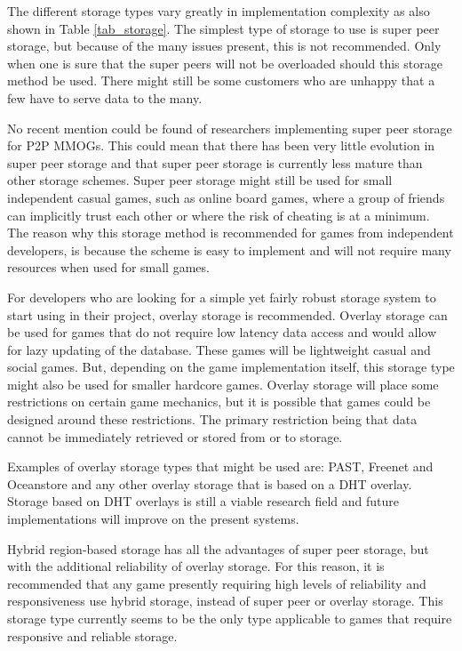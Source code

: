 \documentclass[10pt,a4paper,journal,cspaper,compsoc]{IEEEtran}
\begin{document}
The different storage types vary greatly in implementation complexity as also shown in Table \ref{tab_storage}. The simplest type of storage to use
is super peer storage, but because of the many issues present, this is not recommended. Only when one is sure that the super peers will not be
overloaded should this storage method be used. There might still be some customers who are unhappy that a few have to serve data to the many.

No recent mention could be found of researchers implementing super peer storage for P2P MMOGs. This could mean that there has been very little
evolution in super peer storage and that super peer storage is currently less mature than other storage schemes. Super peer storage might still be
used for small independent casual games, such as online board games, where a group of friends can implicitly trust each other or where the risk of
cheating is at a minimum. The reason why this storage method is recommended for games from independent developers, is because the scheme is easy to
implement and will not require many resources when used for small games.

For developers who are looking for a simple yet fairly robust storage system to start using in their project, overlay storage is recommended. Overlay
storage can be used for games that do not require low latency data access and would allow for lazy updating of the database. These games will be
lightweight casual and social games. But, depending on the game implementation itself, this storage type might also be used for smaller hardcore
games. Overlay storage will place some restrictions on certain game mechanics, but it is possible that games could be designed around these
restrictions. The primary restriction being that data cannot be immediately retrieved or stored from or to storage.

Examples of overlay storage types that might be used are: PAST, Freenet and Oceanstore and any other overlay storage that is based on a DHT overlay.
Storage based on DHT overlays is still a viable research field and future implementations will improve on the present systems.

Hybrid region-based storage has all the advantages of super peer storage, but with the additional reliability of overlay storage. For this reason, it
is recommended that any game presently requiring high levels of reliability and responsiveness use hybrid storage, instead of super peer or overlay
storage. This storage type currently seems to be the only type applicable to games that require responsive and reliable storage.
\end{document}
